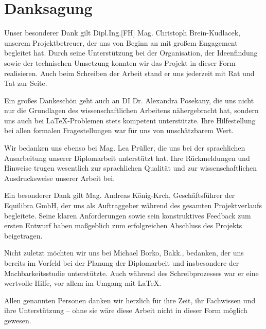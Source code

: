 \chapter{Danksagung} 

Unser besonderer Dank gilt Dipl.Ing.[FH] Mag. Christoph Brein-Kudlacek, unserem Projektbetreuer, der uns von Beginn an mit großem Engagement begleitet hat. Durch seine Unterstützung bei der Organisation, der Ideenfindung sowie der technischen Umsetzung konnten wir das Projekt in dieser Form realisieren. Auch beim Schreiben der Arbeit stand er uns jederzeit mit Rat und Tat zur Seite.

Ein großes Dankeschön geht auch an DI Dr. Alexandra Posekany, die uns nicht nur die Grundlagen des wissenschaftlichen Arbeitens nähergebracht hat, sondern uns auch bei LaTeX-Problemen stets kompetent unterstützte. Ihre Hilfestellung bei allen formalen Fragestellungen war für uns von unschätzbarem Wert.

Wir bedanken uns ebenso bei Mag. Lea Prüller, die uns bei der sprachlichen Ausarbeitung unserer Diplomarbeit unterstützt hat. Ihre Rückmeldungen und Hinweise trugen wesentlich zur sprachlichen Qualität und zur wissenschaftlichen Ausdrucksweise unserer Arbeit bei.

Ein besonderer Dank gilt Mag. Andreas König-Krch, Geschäftsführer der Equilibra GmbH, der uns als Auftraggeber während des gesamten Projektverlaufs begleitete. Seine klaren Anforderungen sowie sein konstruktives Feedback zum ersten Entwurf haben maßgeblich zum erfolgreichen Abschluss des Projekts beigetragen.

Nicht zuletzt möchten wir uns bei Michael Borko, Bakk., bedanken, der uns bereits im Vorfeld bei der Planung der Diplomarbeit und insbesondere der Machbarkeitsstudie unterstützte. Auch während des Schreibprozesses war er eine wertvolle Hilfe, vor allem im Umgang mit LaTeX.

Allen genannten Personen danken wir herzlich für ihre Zeit, ihr Fachwissen und ihre Unterstützung – ohne sie wäre diese Arbeit nicht in dieser Form möglich gewesen. \cite{prompt-gpt-write-danksagung}
